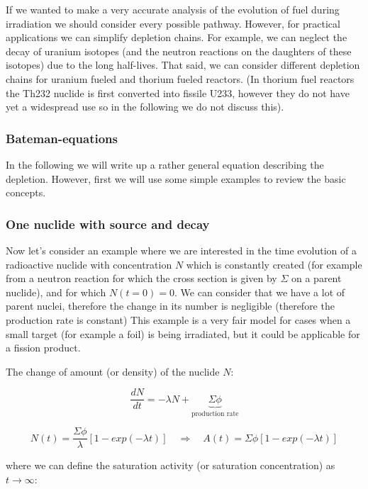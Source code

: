 If we wanted to  make a very accurate analysis of the evolution of fuel during irradiation we should consider every possible pathway. However, for practical applications we can simplify depletion chains. For example, we can neglect the decay of uranium isotopes (and the neutron reactions on the daughters of these isotopes) due to the long half-lives. That said, we can consider different depletion chains for uranium fueled and thorium fueled reactors. (In thorium fuel reactors the Th232 nuclide is first converted into fissile U233, however they do not have yet a widespread use so in the following we do not discuss this).

\subsubsection{Bateman-equations}

In the following we will write up a rather general equation describing the depletion. However, first we will use some simple examples to review the basic concepts.

\subsubsection*{One nuclide with source and decay}

Now let's consider an example where we are interested in the time evolution of a radioactive nuclide with concentration $N$ which is constantly created (for example from a neutron reaction for which the cross section is given by $\Sigma$ on a parent nuclide), and for which $N(t=0)=0$. We can consider that we have a lot of parent nuclei, therefore the change in its number is negligible (therefore the production rate is constant) This example is a very fair model for cases when a small target (for example a foil) is being irradiated, but it could be applicable for a fission product.

The change of amount (or density) of the nuclide $N$:

\begin{equation}
\frac{dN}{dt}=-\lambda N + \underbrace{\Sigma\phi}_{\text{production rate}}
\end{equation}

\begin{equation}
N(t)=\frac{\Sigma\phi}{\lambda}[1-exp(-\lambda t)] \quad \Rightarrow \quad A(t)=\Sigma\phi[1-exp(-\lambda t)]
\end{equation}

\noindent where we can define the saturation activity (or saturation concentration) as $t\rightarrow \infty$:

